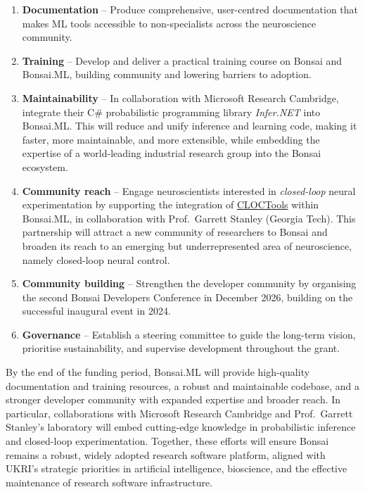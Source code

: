\begin{enumerate}

  \item \textbf{Documentation} – Produce comprehensive, user-centred
documentation that makes ML tools accessible to non-specialists across the
neuroscience community.  

  \item \textbf{Training} – Develop and deliver a practical training course on
Bonsai and Bonsai.ML, building community and lowering barriers to adoption.  

  \item \textbf{Maintainability} – In collaboration with Microsoft Research
  Cambridge, integrate their C\# probabilistic programming library
  \emph{Infer.NET} into Bonsai.ML. This will reduce and unify inference and
  learning code, making it faster, more maintainable, and more extensible,
  while embedding the expertise of a world-leading industrial research group
  into the Bonsai ecosystem.

  \item \textbf{Community reach} – Engage neuroscientists interested in
\emph{closed-loop} neural experimentation by supporting the integration of
\href{https://cloctools.github.io/}{CLOCTools} within Bonsai.ML, in
collaboration with Prof.~Garrett Stanley (Georgia Tech). This partnership will
attract a new community of researchers to Bonsai and broaden its reach to an
emerging but underrepresented area of neuroscience, namely closed-loop neural control.

  \item \textbf{Community building} – Strengthen the developer community by
organising the second Bonsai Developers Conference in December 2026, building
on the successful inaugural event in 2024.  

  \item \textbf{Governance} – Establish a steering committee to guide the
long-term vision, prioritise sustainability, and supervise development
throughout the grant.

\end{enumerate}

By the end of the funding period, Bonsai.ML will provide high-quality
documentation and training resources, a robust and maintainable codebase, and a
stronger developer community with expanded expertise and broader reach. In
particular, collaborations with Microsoft Research Cambridge and
Prof.~Garrett Stanley’s laboratory will embed cutting-edge knowledge in
probabilistic inference and closed-loop experimentation. Together, these
efforts will ensure Bonsai remains a robust, widely adopted research
software platform, aligned with UKRI’s strategic priorities in artificial
intelligence, bioscience, and the effective maintenance of research software infrastructure.

